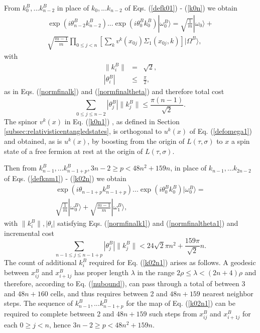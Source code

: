 \documentclass[twocolumn,amsmath,amssymb]{revtex4-1}
\begin{document}
From $k^B_0, ... k^B_{n-2}$ in place of $k_0, ... k_{n-2}$ of Eqs. (\ref{defk01}) - (\ref{k0n})
we obtain
\begin{multline}
\label{k0n1}
\exp( i \theta^B_{n-2} k^B_{n-2}) ... \exp( i \theta_0 ^Bk^B_0) |\omega^B_0 \rangle  = 
\sqrt{\frac{1}{m}} |\omega_0 \rangle  + \\
\sqrt{\frac{m - 1}{m}} \prod_{0 \le j < n} [\sum_k v^k(x_{0j}) \Sigma _1( x_{0j}, k)] |\Omega^B \rangle ,
\end{multline}
with
\begin{subequations}
\begin{eqnarray}
\label{normfinalk1}
\parallel k_i^B \parallel & = & \sqrt{2},\\
\label{normfinaltheta1}
| \theta_i^B | & \le & \frac{\pi}{2},
\end{eqnarray}
\end{subequations}
as in Eqs. (\ref{normfinalk}) and
(\ref{normfinaltheta}) and therefore total cost
\begin{equation}
  \label{kbcost}
  \sum_{0 \le j \le n - 2} |\theta^B_j| \parallel k^B_j \parallel \le \frac{ \pi (n - 1)}{\sqrt{2}}.
\end{equation}
The spinor $v^k(x)$ in Eq. (\ref{k0n1}) ,
as defined in Section \ref{subsec:relativisticentangledstates},
is orthogonal to $u^k(x)$ of Eq. (\ref{defomega1})
and obtained, as is $u^k(x)$, by boosting from the
origin of $L( \tau, \sigma)$ to $x$
a spin state of a free fermion at rest at
the origin of $L( \tau, \sigma)$.


Then from $k^B_{n-1}, ... k^B_{n - 1 +p}, 3n - 2 \ge p < 48 n^2 + 159 n$,
in place of
$k_{n-1}, ... k_{2n-2}$ of
Eqs. (\ref{defknm1}) - (\ref{k02n}) we obtain
\begin{multline}
\label{k02n1}
\exp( i \theta_{n-1 + p} k^B_{n-1 + p}) ... \exp( i \theta_0 ^Bk^B_0) |\omega^B_0 \rangle  = \\
\sqrt{\frac{1}{m}} |\omega^B_0 \rangle  +
\sqrt{\frac{m -1}{m}} |\omega^B_1 \rangle ,
\end{multline}
with $\parallel k^B_i \parallel, |\theta_i|$ satisfying Eqs. (\ref{normfinalk1}) and
(\ref{normfinaltheta1})
and incremental cost
\begin{equation}
  \label{kbcost1}
  \sum_{n-1\le j \le n - 1 +p} |\theta^B_j| \parallel k^B_j \parallel < 24 \sqrt{2} \pi n^2 + \frac{159 \pi}{\sqrt{2}} n.
\end{equation}
The count of additional $k^B_i$ required for Eq. (\ref{k02n1}) arises as follows.
A geodesic between $x^B_{ij}$ and $x^B_{i+1j}$ has proper length $\lambda$ in the range $2 \rho \le \lambda < (2 n + 4) \rho$
and therefore, according to Eq. (\ref{nubound}), can pass through a total of between 3
and $48 n + 160$ cells, and thus requires between 2 and $48 n + 159$
nearest neighbor steps. The sequence of $k^B_{n-1}, ... k^B_{n - 1 +p}$
for the map of Eq. (\ref{k02n1})
can be required to complete between 2 and $48 n + 159$ such steps from $x^B_{ij}$ and $x^B_{i+1j}$
for each $0 \ge j < n$, hence $3n - 2 \ge p < 48 n^2 + 159 n$.
\end{document}
